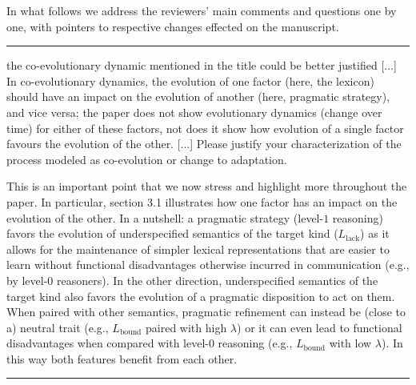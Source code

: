 \documentclass[12pt,a4paper]{article}
\begin{document}
In what follows we address the reviewers' main comments and questions one by one, with pointers
to respective changes effected on the manuscript.


\vspace{1cm}

%

\noindent\rule{\textwidth}{1pt}

\begin{mdframed}[backgroundcolor=gray!25,linecolor=gray!25,frametitle= Reviewer \thereviewerCounter~comment \thereviewerCommentCounter \hfill ~~({\it co-evolution})]
the co-evolutionary dynamic mentioned in the title could be better justified [...] In co-evolutionary dynamics, the evolution of one factor (here, the lexicon) should have an impact on the evolution of another (here, pragmatic strategy), and vice versa; the paper does not show evolutionary dynamics (change over time) for either of these factors, not does it show how evolution of a single factor favours the evolution of the other. [...] Please justify your characterization of the process modeled as co-evolution or change to adaptation.

\end{mdframed}

This is an important point that we now stress and highlight more throughout the paper. In
particular, section 3.1 illustrates how one factor has an impact on the evolution of the
other. In a nutshell: a pragmatic strategy (level-$1$ reasoning) favors the evolution of
underspecified semantics of the target kind ($L_{\text{lack}}$) as it allows for the
maintenance of simpler lexical representations that are easier to learn without functional
disadvantages otherwise incurred in communication (e.g., by level-$0$ reasoners). In the other
direction, underspecified semantics of the target kind also favors the evolution of a pragmatic
disposition to act on them. When paired with other semantics, pragmatic refinement can instead
be (close to a) neutral trait (e.g., $L_{\text{bound}}$ paired with high $\lambda$) or it can
even lead to functional disadvantages when compared with level-$0$ reasoning (e.g.,
$L_{\text{bound}}$ with low $\lambda$). In this way both features benefit from each other.

%

\vspace{.75cm}
\noindent\rule{\textwidth}{1pt}
\end{document}
